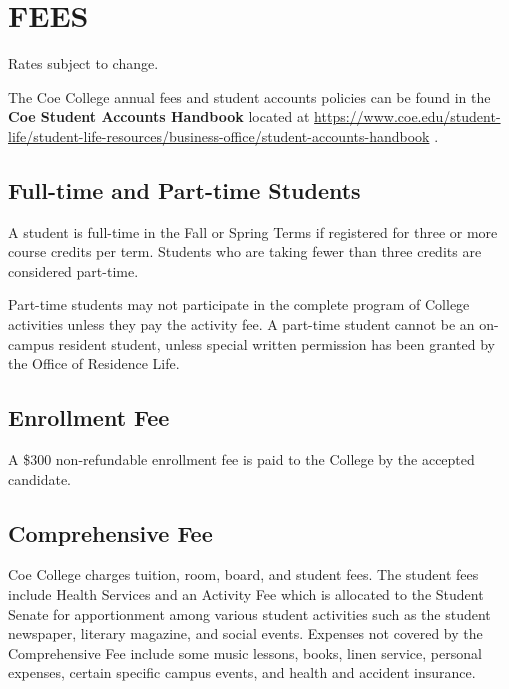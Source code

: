 \documentclass[
  letterpaper,
]{scrbook}
\begin{document}
\hypertarget{fees}{%
\section{FEES}\label{fees}}

Rates subject to change.

The Coe College annual fees and student accounts policies can be found
in the \textbf{Coe Student Accounts Handbook} located at
\url{https://www.coe.edu/student-life/student-life-resources/business-office/student-accounts-handbook}
.

\hypertarget{full-time-and-part-time-students}{%
\subsection{Full-time and Part-time
Students}\label{full-time-and-part-time-students}}

A student is full-time in the Fall or Spring Terms if registered for
three or more course credits per term. Students who are taking fewer
than three credits are considered part-time.

Part-time students may not participate in the complete program of
College activities unless they pay the activity fee. A part-time student
cannot be an on-campus resident student, unless special written
permission has been granted by the Office of Residence Life.

\hypertarget{enrollment-fee}{%
\subsection{Enrollment Fee}\label{enrollment-fee}}

A \$300 non-refundable enrollment fee is paid to the College by the
accepted candidate.

\hypertarget{comprehensive-fee}{%
\subsection{Comprehensive Fee}\label{comprehensive-fee}}

Coe College charges tuition, room, board, and student fees. The student
fees include Health Services and an Activity Fee which is allocated to
the Student Senate for apportionment among various student activities
such as the student newspaper, literary magazine, and social events.
Expenses not covered by the Comprehensive Fee include some music
lessons, books, linen service, personal expenses, certain specific
campus events, and health and accident insurance.
\end{document}
